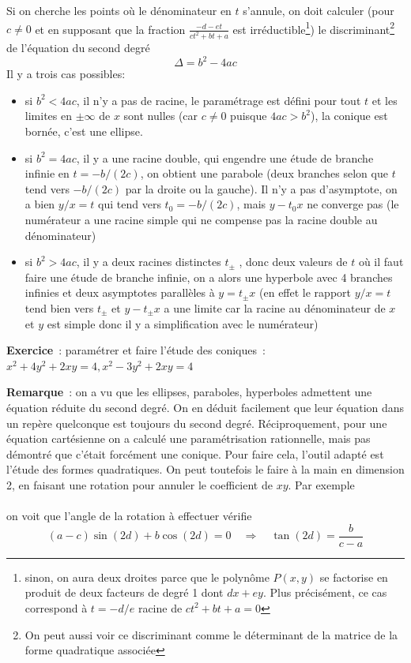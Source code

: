 \documentclass[a4paper,11pt]{article}
\begin{document}
\begin{giacjshere}
Si on cherche les points o\`u le d\'enominateur en $t$ s'annule, on doit
calculer  (pour $c\neq 0$ et en supposant que la fraction
$\frac{-d-et}{ct^2+bt+a}$ est irr\'eductible\footnote{sinon, on 
aura deux droites parce que le
polyn\^ome $P(x,y)$ se factorise en produit de deux facteurs
de degr\'e 1 dont $dx+ey$. Plus pr\'ecis\'ement, ce cas
correspond \`a $t=-d/e$ racine de $ct^2+bt+a=0$})
le discriminant\footnote{On peut aussi voir ce discriminant comme le
d\'eterminant de la matrice de la forme quadratique associ\'ee} 
de l'\'equation du second degr\'e
$$ \Delta= b^2-4ac$$
Il y a trois cas possibles: 
\begin{itemize}
\item si $b^2<4ac$, il n'y a pas de racine, le
param\'etrage est d\'efini pour tout $t$ et les limites en $\pm
\infty$ de $x$ sont nulles (car $c \neq 0$ puisque $4ac>b^2$),
la conique est born\'ee, c'est une ellipse.
\item si $b^2=4ac$, il y a une racine double, qui engendre
une \'etude de branche infinie en $t=-b/(2c)$, on
obtient une parabole (deux branches selon que $t$ tend
vers $-b/(2c)$ par la droite ou la gauche). Il n'y a pas
d'asymptote, on a bien $y/x=t$ qui tend vers $t_0=-b/(2c)$,
mais $y-t_0x$ ne converge pas (le num\'erateur a une racine simple
qui ne compense pas la racine double au d\'enominateur)
\item si $b^2>4ac$, il y a deux racines distinctes $t_\pm$ , 
donc deux valeurs de $t$ o\`u il faut faire une \'etude
de branche infinie, on a alors une
hyperbole
avec 4 branches infinies et deux asymptotes parall\`eles \`a
$y=t_\pm x$ (en effet le rapport $y/x=t$ tend bien
vers $t_\pm$ et $y-t_\pm x$ a une limite car la racine au
d\'enominateur de $x$ et $y$ est simple 
donc il y a simplification avec le num\'erateur)
\end{itemize}
{\bf Exercice}~: param\'etrer et faire l'\'etude des coniques~:\\
$x^2+4y^2+2xy=4, x^2-3y^2+2xy=4$

{\bf Remarque}~: 
on a vu que les ellipses, paraboles, hyperboles admettent une
\'equation r\'eduite du second degr\'e. On en d\'eduit facilement que
leur \'equation dans un rep\`ere quelconque est toujours
du second degr\'e. R\'eciproquement, pour une \'equation cart\'esienne
on a calcul\'e une param\'etrisation rationnelle, mais pas
d\'emontr\'e que c'\'etait forc\'ement une conique. Pour faire
cela, l'outil adapt\'e est l'\'etude des formes quadratiques. On peut
toutefois le faire \`a la main en dimension 2, en faisant une rotation
pour annuler le coefficient de $xy$. Par exemple\\
\\
on voit que l'angle de la rotation \`a effectuer v\'erifie
$$(a-c)\sin(2d)+b\cos(2d)=0 \quad \Rightarrow \quad \tan(2d)=\frac{b}{c-a}$$


\end{giacjshere}
\end{document}
